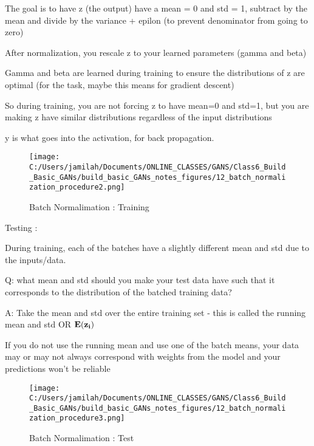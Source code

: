 \documentclass[11pt, onecolumn]{article}
\begin{document}
The goal is to have z (the output) have a mean = 0 and std = 1, subtract by the mean and divide by the variance + epilon (to prevent denominator from going to zero)

After normalization, you rescale z to your learned parameters (gamma and beta)

Gamma and beta are learned during training to ensure the distributions of z are optimal (for the task, maybe this means for gradient descent)

So during training, you are not forcing z to have mean=0 and std=1, but you are making z have similar distributions regardless of the input distributions

y is what goes into the activation, for back propagation.

\begin{figure}[htp]
\begin{center}
\texttt{[image: C:/Users/jamilah/Documents/ONLINE\_CLASSES/GANS/Class6\_Build\_Basic\_GANs/build\_basic\_GANs\_notes\_figures/12\_batch\_normalization\_procedure2.png]}
\end{center}
\caption{Batch Normalimation : Training}
\label{12_batch_normalization_procedure2}
\end{figure}

Testing : 

During training, each of the batches have a slightly different mean and std due to the inputs/data.

Q: what mean and std should you make your test data have such that it corresponds to the distribution of the batched training data?

A: Take the mean and std over the entire training set - this is called the running mean and std OR $\bf{E}(z_i)$

If you do not use the running mean and use one of the batch means, your data may or may not always correspond with weights from the model and your predictions won't be reliable 

\begin{figure}[htp]
\begin{center}
\texttt{[image: C:/Users/jamilah/Documents/ONLINE\_CLASSES/GANS/Class6\_Build\_Basic\_GANs/build\_basic\_GANs\_notes\_figures/12\_batch\_normalization\_procedure3.png]}
\end{center}
\caption{Batch Normalimation : Test}
\label{12_batch_normalization_procedure3}
\end{figure}
\end{document}
